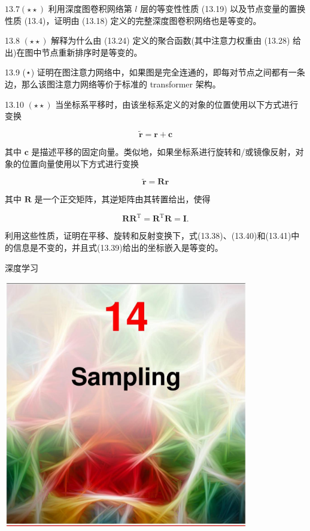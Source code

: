 \documentclass[10pt]{article}
\begin{document}
\({13.7}\left( {\star  \star  }\right)\) 利用深度图卷积网络第 \(l\) 层的等变性性质 (13.19) 以及节点变量的置换性质 (13.4)，证明由 (13.18) 定义的完整深度图卷积网络也是等变的。

13.8 \(\left( {\star  \star  }\right)\) 解释为什么由 (13.24) 定义的聚合函数(其中注意力权重由 (13.28) 给出)在图中节点重新排序时是等变的。

13.9 (⋆) 证明在图注意力网络中，如果图是完全连通的，即每对节点之间都有一条边，那么该图注意力网络等价于标准的 transformer 架构。

13.10 \(\left( {\star  \star  }\right)\) 当坐标系平移时，由该坐标系定义的对象的位置使用以下方式进行变换

\[
\widetilde{\mathbf{r}} = \mathbf{r} + \mathbf{c} \tag{13.45}
\]

其中 \(\mathbf{c}\) 是描述平移的固定向量。类似地，如果坐标系进行旋转和/或镜像反射，对象的位置向量使用以下方式进行变换

\[
\widetilde{\mathbf{r}} = \mathbf{{Rr}} \tag{13.46}
\]

其中 \(\mathbf{R}\) 是一个正交矩阵，其逆矩阵由其转置给出，使得

\[
\mathbf{R}{\mathbf{R}}^{\mathrm{T}} = {\mathbf{R}}^{\mathrm{T}}\mathbf{R} = \mathbf{I}. \tag{13.47}
\]

利用这些性质，证明在平移、旋转和反射变换下，式(13.38)、(13.40)和(13.41)中的信息是不变的，并且式(13.39)给出的坐标嵌入是等变的。

深度学习

\begin{center}
\includegraphics[max width=0.8\textwidth]{images/0194e279-9b28-703a-88f4-c3ac21e2010d_448_474_351_1074_1085_0.jpg}
\end{center}
\hspace*{3em} 
\end{document}
